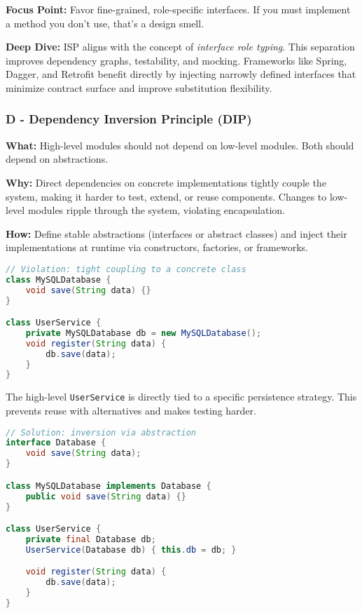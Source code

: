 \documentclass[a4paper,12pt]{article}
\begin{document}
\textbf{Focus Point:} Favor fine-grained, role-specific interfaces. If you must implement a method you don’t use, that’s a design smell.

\textbf{Deep Dive:}  
ISP aligns with the concept of \textit{interface role typing}. This separation improves dependency graphs, testability, and mocking. Frameworks like Spring, Dagger, and Retrofit benefit directly by injecting narrowly defined interfaces that minimize contract surface and improve substitution flexibility.

\subsubsection{D - Dependency Inversion Principle (DIP)}

\textbf{What:} High-level modules should not depend on low-level modules. Both should depend on abstractions.

\textbf{Why:} Direct dependencies on concrete implementations tightly couple the system, making it harder to test, extend, or reuse components. Changes to low-level modules ripple through the system, violating encapsulation.

\textbf{How:} Define stable abstractions (interfaces or abstract classes) and inject their implementations at runtime via constructors, factories, or frameworks.

\begin{lstlisting}[language=Java]
// Violation: tight coupling to a concrete class
class MySQLDatabase {
    void save(String data) {}
}

class UserService {
    private MySQLDatabase db = new MySQLDatabase();
    void register(String data) {
        db.save(data);
    }
}
\end{lstlisting}

The high-level \texttt{UserService} is directly tied to a specific persistence strategy. This prevents reuse with alternatives and makes testing harder.

\begin{lstlisting}[language=Java]
// Solution: inversion via abstraction
interface Database {
    void save(String data);
}

class MySQLDatabase implements Database {
    public void save(String data) {}
}

class UserService {
    private final Database db;
    UserService(Database db) { this.db = db; }

    void register(String data) {
        db.save(data);
    }
}
\end{lstlisting}
\end{document}
